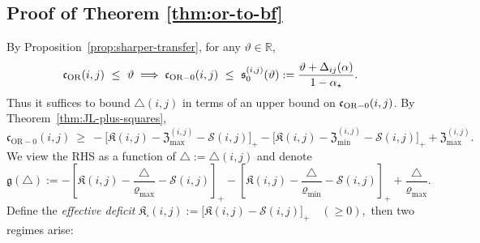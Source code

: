 \documentclass[twoside,11pt]{article}
\numberwithin{equation}{section}
\numberwithin{theorem}{section}
\numberwithin{example}{section}
\begin{document}
\subsection{Proof of Theorem \ref{thm:or-to-bf}}
By Proposition~\ref{prop:sharper-transfer}, for any $\vartheta\in\mathbb R$,
\begin{equation}
\label{eq:lazy-to-nonlazy}
\mathfrak c_{\rm OR}(i,j)\ \le\ \vartheta
\implies
\mathfrak c_{\rm OR-0}(i,j)\ \le\ \mathfrak s_0^{(i,j)}(\vartheta)
:= \frac{\vartheta+\Delta_{ij}(\alpha)}{\,1-\alpha_\star\,}.
\end{equation}
Thus it suffices to bound $\triangle(i,j)$ in terms of an upper bound on $\mathfrak c_{\rm OR-0}(i,j)$. By Theorem~\ref{thm:JL-plus-squares},
\begin{equation}
\label{eq:JL-aug-restated}
\mathfrak c_{\mathrm{OR}-0}(i,j)
\ \ge\
-\bigl[\mathfrak K(i,j)-\mathfrak Z_{\max}^{(i,j)}-\mathscr S(i,j)\bigr]_+
-\bigl[\mathfrak K(i,j)-\mathfrak Z_{\min}^{(i,j)}-\mathscr S(i,j)\bigr]_+
+\mathfrak Z_{\max}^{(i,j)}.
\end{equation}
We view the RHS as a function of $\triangle:=\triangle(i,j)$ and denote
\begin{equation}
\label{eq:g-square-def}
\mathfrak g(\triangle)
:=
-\left[\mathfrak K(i,j)-\frac{\triangle}{\varrho_{\max}}-\mathscr S(i,j) \right]_+
-\left[\mathfrak K(i,j)-\frac{\triangle}{\varrho_{\min}}-\mathscr S (i,j)\right]_+
+\frac{\triangle}{\varrho_{\max}}.
\end{equation}
Define the \emph{effective deficit}
\(
\mathfrak K_{\square}(i,j) :=\bigl[\mathfrak K (i,j)-\mathscr S(i,j)\bigr]_+\quad(\ge 0),
\)
then two regimes arise:
\end{document}
